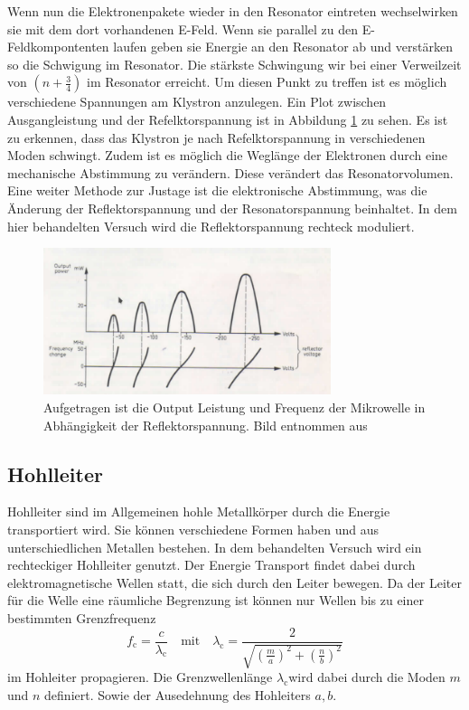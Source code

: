 Wenn nun die Elektronenpakete wieder in den Resonator eintreten wechselwirken sie mit dem dort vorhandenen E-Feld.
Wenn sie parallel zu den E-Feldkompontenten laufen geben sie Energie an den Resonator ab und verstärken so die Schwigung im Resonator.
Die stärkste Schwingung wir bei einer Verweilzeit von $(n + \frac{3}{4})$ im Resonator erreicht.
Um diesen Punkt zu treffen ist es möglich verschiedene Spannungen am Klystron anzulegen.
Ein Plot zwischen Ausgangleistung und der Refelktorspannung ist in Abbildung \ref{fig:output_refelktor_voltage} zu sehen.
Es ist zu erkennen, dass das Klystron je nach Refelktorspannung in verschiedenen Moden schwingt.
Zudem ist es möglich die Weglänge der Elektronen durch eine mechanische Abstimmung zu verändern.
Diese verändert das Resonatorvolumen.
Eine weiter Methode zur Justage ist die elektronische Abstimmung, was die Änderung der Reflektorspannung und der Resonatorspannung beinhaltet.
In dem hier behandelten Versuch wird die Reflektorspannung rechteck moduliert.

\begin{figure}
    \centering
    \includegraphics[width=0.75\textwidth]{content/data/refelx_spannung_schema.png}
    \caption{Aufgetragen ist die Output Leistung und Frequenz der Mikrowelle in Abhängigkeit der Reflektorspannung. Bild entnommen aus \cite[6]{Anleitung}}
    \label{fig:output_refelktor_voltage}
\end{figure}

\subsection{Hohlleiter}
Hohlleiter sind im Allgemeinen hohle Metallkörper durch die Energie transportiert wird.
Sie können verschiedene Formen haben und aus unterschiedlichen Metallen bestehen.
In dem behandelten Versuch wird ein rechteckiger Hohlleiter genutzt.
Der Energie Transport findet dabei durch elektromagnetische Wellen statt, die sich durch den Leiter bewegen.
Da der Leiter für die Welle eine räumliche Begrenzung ist können nur Wellen bis zu einer bestimmten Grenzfrequenz
\begin{equation}
    f_\text{c} = \frac{c}{\lambda _\text{c}} \quad \text{mit} \quad \lambda _\text{c} = \frac{2}{\sqrt{ \left ( \frac{m}{a} \right )^2 + \left ( \frac{n}{b} \right )^2}}
    \label{eq:grenzwellenlaenge}
\end{equation}
im Hohleiter propagieren.
Die Grenzwellenlänge $\lambda _\text{c} $wird dabei durch die Moden $m$ und $n$ definiert. Sowie der Ausedehnung des Hohleiters $a, b$.


